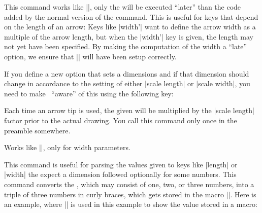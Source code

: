 \begin{command}{\pgfarrowsaddtolateoptions{}}
    This command works like |\pgfarrowsaddtooptions|, only the  will
    be executed ``later'' than the code added by the normal version of the
    command. This is useful for keys that depend on the length of an arrow:
    Keys like |width'| want to define the arrow width as a multiple of the
    arrow length, but when the |width'| key is given, the length may not yet
    have been specified. By making the computation of the width a ``late''
    option, we ensure that |\pgfarrowlength| will have been setup correctly.
\end{command}

If you define a new option that sets a dimensions and if that dimension should
change in accordance to the setting of either |scale length| or |scale width|,
you need to make \pgfname\ ``aware'' of this using the following key:

\begin{command}{\pgfarrowsaddtolengthscalelist{}}
    Each time an arrow tip is used, the given  will be
    multiplied by the |scale length| factor prior to the actual drawing. You
    call this command only once in the preamble somewhere.
\end{command}

\begin{command}{\pgfarrowsaddtowidthscalelist{}}
    Works like |\pgfarrowsaddtolengthscalelist|, only for width parameters.
\end{command}


\begin{command}{\pgfarrowsthreeparameters{}}
    This command is useful for parsing the values given to keys like |length|
    or |width| the expect a dimension followed optionally for some numbers.
    This command converts the ,
    which may consist of one, two, or three numbers, into a triple of three
    numbers in curly braces, which gets stored in the macro
    |\pgfarrowstheparameters|. Here is an example, where |\showvalueofmacro| is
    used in this example to show the value stored in a macro:
    \makeatletter
    \def\showvalueofmacro#1{%
        \texttt{\expandafter\expandafter\expandafter\expandafter\expandafter\expandafter\expandafter\pgfutil@gobble\expandafter\expandafter\expandafter\string\expandafter\csname#1\endcsname}
    }
\begin{codeexample}[]
\showvalueofmacro\pgfarrowstheparameters
\end{codeexample}
\end{command}


